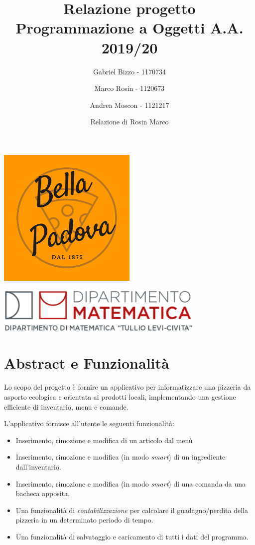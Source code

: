 \documentclass[
  10pt,
]{article}
\title{Relazione progetto Programmazione a Oggetti A.A. 2019/20}
\author{Gabriel Bizzo - 1170734 \\ \and Marco Rosin - 1120673 \\ \and Andrea Moscon - 1121217}
\date{Relazione di Rosin Marco}
\providecommand{\tightlist}{%
  \setlength{\itemsep}{0pt}\setlength{\parskip}{0pt}}
\begin{document}
\maketitle

\begin{center}
  \includegraphics[width=0.5\textwidth,height=\textheight]{./logo.png}
\end{center}
\begin{center}
  \includegraphics[width=0.75\textwidth,height=\textheight]{./Logo-DM.png}
\end{center}

\newpage

\hypertarget{abstract-e-funzionalituxe0}{%
\section{Abstract e Funzionalità}\label{abstract-e-funzionalituxe0}}

Lo scopo del progetto è fornire un applicativo per informatizzare una
pizzeria da asporto ecologica e orientata ai prodotti locali,
implementando una gestione efficiente di inventario, menu e comande.

L'applicativo fornisce all'utente le seguenti funzionalità:

\begin{itemize}
\tightlist
\item
  Inserimento, rimozione e modifica di un articolo dal menù
\item
  Inserimento, rimozione e modifica (in modo \emph{smart}) di un
  ingrediente dall'inventario.
\item
  Inserimento, rimozione e modifica (in modo \emph{smart}) di una
  comanda da una bacheca apposita.
\item
  Una funzionalità di \emph{contabilizzazione} per calcolare il
  guadagno/perdita della pizzeria in un determinato periodo di tempo.
\item
  Una funzionalità di salvataggio e caricamento di tutti i dati del
  programma.
\end{itemize}
\end{document}
